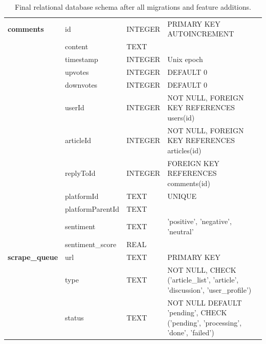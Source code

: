 \documentclass[11pt,a4paper]{article}
\begin{document}
\begin{table}[H]
{\begin{tabular}{@{}llll@{}}
			\textbf{comments}      & id               & INTEGER            & PRIMARY KEY AUTOINCREMENT                                                     \\
			                       & content          & TEXT               &                                                                               \\
			                       & timestamp        & INTEGER            & Unix epoch                                                                    \\
			                       & upvotes          & INTEGER            & DEFAULT 0                                                                     \\
			                       & downvotes        & INTEGER            & DEFAULT 0                                                                     \\
			                       & userId           & INTEGER            & NOT NULL, FOREIGN KEY REFERENCES users(id)                                    \\
			                       & articleId        & INTEGER            & NOT NULL, FOREIGN KEY REFERENCES articles(id)                                 \\
			                       & replyToId        & INTEGER            & FOREIGN KEY REFERENCES comments(id)                                           \\
			                       & platformId       & TEXT               & UNIQUE                                                                        \\
			                       & platformParentId & TEXT               &                                                                               \\
			                       & sentiment        & TEXT               & 'positive', 'negative', 'neutral'                                             \\
			                       & sentiment\_score & REAL               &                                                                               \\ \midrule
			\textbf{scrape\_queue} & url              & TEXT               & PRIMARY KEY                                                                   \\
			                       & type             & TEXT               & NOT NULL, CHECK ('article\_list', 'article', 'discussion', 'user\_profile')   \\
			                       & status           & TEXT               & NOT NULL DEFAULT 'pending', CHECK ('pending', 'processing', 'done', 'failed') \\ \bottomrule
		\end{tabular}%
	}
	\caption{Final relational database schema after all migrations and feature additions.}
	\label{tab:db_schemas}
\end{table}
\end{document}
